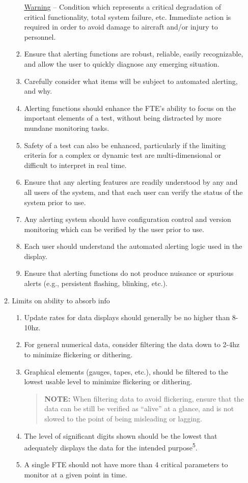 \documentclass[
]{book}
\begin{document}
\begin{enumerate}
\begin{enumerate}
\begin{enumerate}
      \underline{Warning} -- Condition which represents a critical degradation of critical functionality, total system failure, etc. Immediate action is required in order to avoid damage to aircraft and/or injury to personnel.
    \item
      Ensure that alerting functions are robust, reliable, easily recognizable, and allow the user to quickly diagnose any emerging situation.
    \item
      Carefully consider what items will be subject to automated alerting, and why.
    \item
      Alerting functions should enhance the FTE's ability to focus on the important elements of a test, without being distracted by more mundane monitoring tasks.
    \item
      Safety of a test can also be enhanced, particularly if the limiting criteria for a complex or dynamic test are multi-dimensional or difficult to interpret in real time.
    \item
      Ensure that any alerting features are readily understood by any and all users of the system, and that each user can verify the status of the system prior to use.
    \item
      Any alerting system should have configuration control and version monitoring which can be verified by the user prior to use.
    \item
      Each user should understand the automated alerting logic used in the display.
    \item
      Ensure that alerting functions do not produce nuisance or spurious alerts (e.g., persistent flashing, blinking, etc.).
    \end{enumerate}
  \item
    Limits on ability to absorb info

    \begin{enumerate}
    \def\labelenumiii{\arabic{enumiii}.}
    \item
      Update rates for data displays should generally be no higher than 8-10hz.
    \item
      For general numerical data, consider filtering the data down to 2-4hz to minimize flickering or dithering.
    \item
      Graphical elements (gauges, tapes, etc.), should be filtered to the lowest usable level to minimize flickering or dithering.

      \begin{quote}
      \textbf{NOTE:} When filtering data to avoid flickering, ensure that the data can be still be verified as ``alive'' at a glance, and is not slowed to the point of being misleading or lagging.
      \end{quote}
    \item
      The level of significant digits shown should be the lowest that adequately displays the data for the intended purpose\textsuperscript{5}.
    \item
      A single FTE should not have more than 4 critical parameters to monitor at a given point in time.


\end{enumerate}
\end{enumerate}
\end{enumerate}
\end{document}
